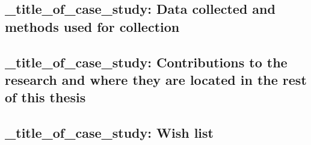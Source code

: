 \subsection{_title_of_case_study: Data collected and methods used for collection}

\subsection{_title_of_case_study: Contributions to the research and where they are located in the rest of this thesis}

\subsection*{_title_of_case_study: Wish list}

\clearpage